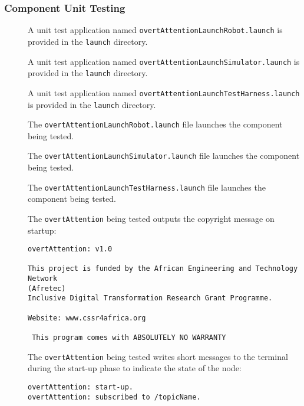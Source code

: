 \documentclass{CSSRforAfrica}
\newcommand{\checkboxChecked}{\fbox{\ding{51}}} %
\newcommand{\checkboxDashed}{\fbox{--}}         %
\begin{document}
\subsubsection{Component Unit Testing}
\label{subsubsection:overt_attention_unit_testing}


\begin{description}
\item[\checkboxDashed] A unit test application named {\small \verb+overtAttentionLaunchRobot.launch+} is provided in the {\small \verb+launch+} directory. 

\item[\checkboxDashed] A unit test application named {\small \verb+overtAttentionLaunchSimulator.launch+} is provided in the {\small \verb+launch+} directory. 

\item[\checkboxDashed] A unit test application named {\small \verb+overtAttentionLaunchTestHarness.launch+} is provided in the {\small \verb+launch+} directory. 

\item[\checkboxDashed] The {\small \verb+overtAttentionLaunchRobot.launch+} file  launches the component being tested.

\item[\checkboxDashed] The {\small \verb+overtAttentionLaunchSimulator.launch+} file  launches the component being tested.

\item[\checkboxDashed] The {\small \verb+overtAttentionLaunchTestHarness.launch+} file  launches the component being tested.

\item[\checkboxChecked]  The {\small \verb+overtAttention+} being tested outputs the copyright message on startup:
\begin{verbatim}
overtAttention: v1.0
 
This project is funded by the African Engineering and Technology Network 
(Afretec) 
Inclusive Digital Transformation Research Grant Programme.
 
Website: www.cssr4africa.org
 
 This program comes with ABSOLUTELY NO WARRANTY
\end{verbatim}

\item[\checkboxChecked]  The {\small \verb+overtAttention+} being tested writes short messages to the terminal during the start-up phase to
 indicate the state of the node:
\begin{verbatim}
overtAttention: start-up.
overtAttention: subscribed to /topicName.
\end{verbatim}


\end{description}
\end{document}
